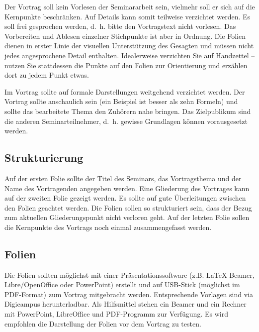\documentclass[final,bibliography=totocnumbered]{include/sikseminar}
\begin{document}
Der Vortrag soll kein Vorlesen der Seminararbeit sein, vielmehr soll er sich auf die Kernpunkte beschränken. Auf Details kann somit teilweise verzichtet werden. Es soll frei gesprochen werden, d.~h. bitte den Vortragstext nicht vorlesen. Das Vorbereiten und Ablesen einzelner Stichpunkte ist aber in Ordnung. Die Folien dienen in erster Linie der visuellen Unterstützung des Gesagten und müssen nicht jedes angesprochene Detail enthalten. Idealerweise verzichten Sie auf Handzettel -- nutzen Sie stattdessen die Punkte auf den Folien zur Orientierung und erzählen dort zu jedem Punkt etwas.

Im Vortrag sollte auf formale Darstellungen weitgehend verzichtet werden. Der Vortrag sollte anschaulich sein (ein Beispiel ist besser als zehn Formeln) und sollte das bearbeitete Thema den Zuhörern nahe bringen. Das Zielpublikum sind die anderen Seminarteilnehmer, d.~h. gewisse Grundlagen können vorausgesetzt werden.

\subsection{Strukturierung}
Auf der ersten Folie sollte der Titel des Seminars, das Vortragsthema und der Name des Vortragenden angegeben werden.
Eine Gliederung des Vortrages kann auf der zweiten Folie gezeigt werden.
Es sollte auf gute Überleitungen zwischen den Folien geachtet werden.
Die Folien sollen so strukturiert sein, dass der Bezug zum aktuellen Gliederungspunkt nicht verloren geht.
Auf der letzten Folie sollen die Kernpunkte des Vortrags noch einmal zusammengefasst werden.

\subsection{Folien}
Die Folien sollten möglichst mit einer Präsentationssoftware (z.B. \LaTeX{} Beamer, Libre/OpenOffice oder PowerPoint) erstellt und auf USB-Stick (möglichst im PDF-Format) zum Vortrag mitgebracht werden. Entsprechende Vorlagen sind via Digicampus herunterladbar. Als Hilfsmittel stehen ein Beamer und ein Rechner mit PowerPoint, LibreOffice und PDF-Programm zur Verfügung. Es wird empfohlen die Darstellung der Folien vor dem Vortrag zu testen.
\end{document}
